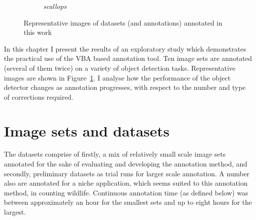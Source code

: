 \begin{figure}[htbp]
\begin{subfigure}[t]{0.24\linewidth}
  \caption{\emph{scallops}}
\end{subfigure}
\caption{Representative images of datasets (and annotations) annotated in this work}
\label{fig:datasets_all}
\end{figure}


In this chapter I present the results of an exploratory study which demonstrates the practical use of the \gls{VBA} based annotation tool. Ten image sets are annotated (several of them twice) on a variety of object detection tasks. Representative images are shown in Figure~\ref{fig:datasets_all}. I analyse how the performance of the object detector changes as annotation progresses, with respect to the number and type of corrections required.

\section{Image sets and datasets}


The datasets comprise of firstly, a mix of relatively small scale image sets annotated for the sake of evaluating and developing the annotation method, and secondly, preliminary datasets as trial runs for larger scale annotation. A number also are annotated for a niche application, which seems suited to this  annotation method, in counting wildlife. Continuous annotation time (as defined below) was between approximately an hour for the smallest sets and up to eight hours for the largest.


